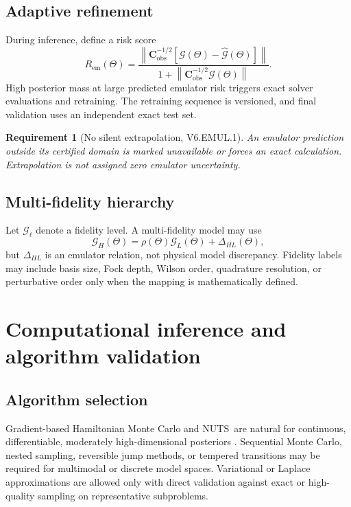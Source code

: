 \documentclass[11pt]{article}
\newtheorem{requirement}[definition]{Requirement}
\newcommand{\cG}{\mathcal G}
\newcommand{\norm}[1]{\left\lVert#1\right\rVert}
\newcommand{\emul}{\mathrm{em}}
\newcommand{\obs}{\mathrm{obs}}
\newcommand{\NUTS}{\ensuremath{\mathrm{NUTS}}}
\begin{document}
\subsection{Adaptive refinement}

During inference, define a risk score
\begin{equation}
 R_{\emul}(\Theta)
 =
 \frac{\norm{\bm C_{\obs}^{-1/2}
 [\cG(\Theta)-\widehat{\cG}(\Theta)]}}
 {1+\norm{\bm C_{\obs}^{-1/2}\cG(\Theta)}}.
 \label{eq:emulator-risk}
\end{equation}
High posterior mass at large predicted emulator risk triggers exact solver
evaluations and retraining.  The retraining sequence is versioned, and final
validation uses an independent exact test set.

\begin{requirement}[No silent extrapolation, V6.EMUL.1]
An emulator prediction outside its certified domain is marked unavailable or
forces an exact calculation.  Extrapolation is not assigned zero emulator
uncertainty.
\end{requirement}

\subsection{Multi-fidelity hierarchy}

Let \(\cG_\ell\) denote a fidelity level.  A multi-fidelity model may use
\begin{equation}
 \cG_H(\Theta)
 =
 \rho(\Theta)\cG_L(\Theta)
 +
 \Delta_{HL}(\Theta),
 \label{eq:multifidelity}
\end{equation}
but \(\Delta_{HL}\) is an emulator relation, not physical model discrepancy.
Fidelity labels may include basis size, Fock depth, Wilson order, quadrature
resolution, or perturbative order only when the mapping is mathematically
defined.

\section{Computational inference and algorithm validation}
\label{sec:computation}

\subsection{Algorithm selection}

Gradient-based Hamiltonian Monte Carlo and \NUTS\ are natural for continuous,
differentiable, moderately high-dimensional posteriors
\cite{HoffmanGelman2014}.  Sequential Monte Carlo, nested sampling, reversible
jump methods, or tempered transitions may be required for multimodal or
discrete model spaces.  Variational or Laplace approximations are allowed only
with direct validation against exact or high-quality sampling on representative
subproblems.
\end{document}
